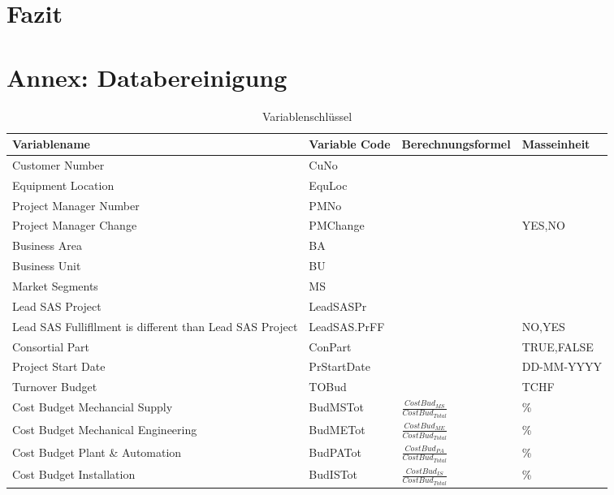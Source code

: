 
\section{Fazit}
\section*{Annex: Databereinigung}
\newpage\begin{landscape}
\begin{center}
\begin{longtable}{p{6cm}|p{4cm}|p{6cm}|p{3cm}}
	\caption{Variablenschlüssel}\\\hline
	\textbf{Variablename} & \textbf{Variable Code} & {\textbf{Berechnungsformel}} & {\textbf{Masseinheit}} \\\hline\endhead
		Customer Number & CuNo  &       &  \\
		Equipment Location & EquLoc &       &  \\
		Project Manager Number & PMNo  &       &  \\
		Project Manager Change & PMChange &       & \multicolumn{1}{l}{{YES,NO}} \\
		Business Area & BA    &       &  \\
		Business Unit & BU    &       &  \\
		Market Segments & MS    &       &  \\
		Lead SAS Project & LeadSASPr &       &  \\
		Lead SAS Fullifllment is different than Lead SAS Project & LeadSAS.PrFF &       & \multicolumn{1}{l}{{NO,YES}} \\
		Consortial Part & ConPart &       & \multicolumn{1}{l}{{TRUE,FALSE}} \\
		Project Start Date & PrStartDate &       & \multicolumn{1}{l}{DD-MM-YYYY} \\
		Turnover Budget & TOBud &       & \multicolumn{1}{l}{TCHF} \\
		Cost Budget Mechancial Supply & BudMSTot & $\frac{Cost Bud_{MS}}{Cost Bud_{Total}}$ & \multicolumn{1}{l}{\%} \\ [3mm]
		Cost Budget Mechanical Engineering & BudMETot & $\frac{Cost Bud_{ME}}{Cost Bud_{Total}}$ & \multicolumn{1}{l}{\%} \\ [3mm]
		Cost Budget Plant \& Automation & BudPATot & $\frac{Cost Bud_{PA}}{Cost Bud_{Total}}$ & \multicolumn{1}{l}{\%} \\ [3mm]
		Cost Budget Installation  & BudISTot & $\frac{Cost Bud_{IS}}{Cost Bud_{Total}}$ & \multicolumn{1}{l}{\%} \\ [3mm]

\end{longtable}
\end{center}
\end{landscape}
